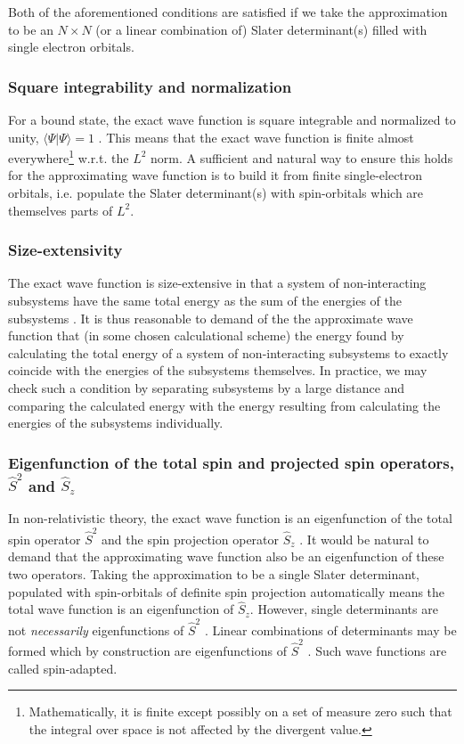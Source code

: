 \documentclass[../../master.tex]{subfiles}
\begin{document}
Both of the aforementioned conditions are satisfied if we take the approximation to be an $N \times N$ (or a linear combination of) Slater determinant(s) filled with single electron orbitals.

\subsubsection*{Square integrability and normalization}
For a bound state, the exact wave function is square integrable and normalized to unity, $\langle \Psi|\Psi\rangle = 1$ \cite{helgaker}. This means that the exact wave function is finite almost everywhere\footnote{Mathematically, it is finite except possibly on a set of measure zero such that the integral over space is not affected by the divergent value.} w.r.t. the $L^2$ norm. A sufficient and natural way to ensure this holds for the approximating wave function is to build it from finite single-electron orbitals, i.e. populate the Slater determinant(s) with spin-orbitals which are themselves parts of $L^2$. 

\subsubsection*{Size-extensivity}
The exact wave function is size-extensive in that a system of non-interacting subsystems have the same total energy as the sum of the energies of the subsystems \cite{helgaker}. It is thus reasonable to demand of the the approximate wave function that (in some chosen calculational scheme) the energy found by calculating the total energy of a system of non-interacting subsystems to exactly coincide with the energies of the subsystems themselves. In practice, we may check such a condition by separating subsystems by a large distance and comparing the calculated energy with the energy resulting from calculating the energies of the subsystems individually. 

\subsubsection*{Eigenfunction of the total spin and projected spin operators, $\hat S^2$ and $\hat S_z$}
In non-relativistic theory, the exact wave function is an eigenfunction of the total spin operator $\hat S^2$ and the spin projection operator $\hat S_z$ \cite{gross}. It would be natural to demand that the approximating wave function also be an eigenfunction of these two operators. Taking the approximation to be a single Slater determinant, populated with spin-orbitals of definite spin projection automatically means the total wave function is an eigenfunction of $\hat S_z$. However, single determinants are not \emph{necessarily} eigenfunctions of $\hat S^2$ \cite{szabo}. Linear combinations of determinants may be formed which by construction are eigenfunctions of $\hat S^2$ \cite{helgaker}. Such wave functions are called spin-adapted. 
\end{document}
